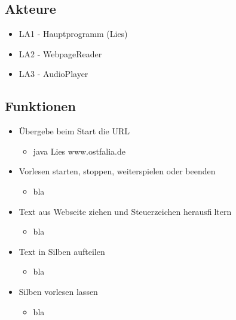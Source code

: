 \documentclass[12pt]{scrartcl}
\begin{document}
\subsection{Akteure}

\begin{itemize}
	\item LA1 - Hauptprogramm (Lies)
	\item LA2 - WebpageReader
	\item LA3 - AudioPlayer
\end{itemize}

\subsection{Funktionen}

\begin{itemize}
	\item Übergebe beim Start die URL
\begin{itemize}
	\item java Lies www.ostfalia.de
\end{itemize}
\end{itemize}

\begin{itemize}
	\item Vorlesen starten, stoppen, weiterspielen oder beenden
\begin{itemize}
	\item bla
\end{itemize}
\end{itemize}

\begin{itemize}
	\item Text aus Webseite ziehen und Steuerzeichen herausfiltern
\begin{itemize}
	\item bla
\end{itemize}
\end{itemize}

\begin{itemize}
	\item Text in Silben aufteilen
\begin{itemize}
	\item bla
\end{itemize}
\end{itemize}

\begin{itemize}
	\item Silben vorlesen lassen
\begin{itemize}
	\item bla
\end{itemize}
\end{itemize}
\end{document}
